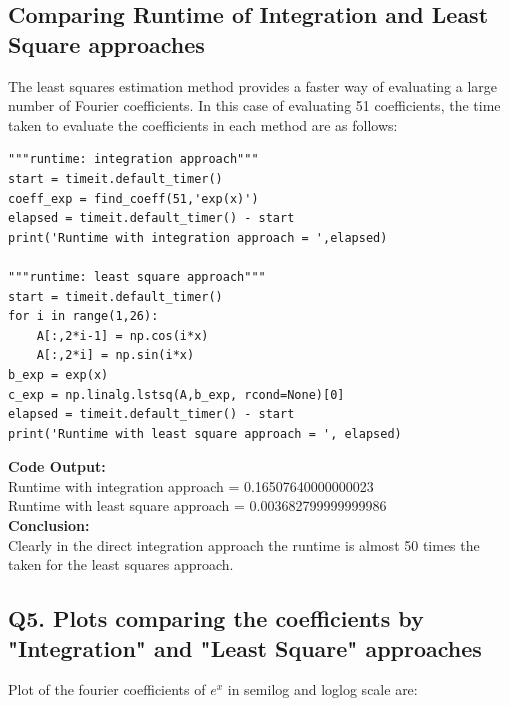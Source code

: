 \documentclass{article}
\begin{document}
\vspace{5mm}

\subsection*{Comparing Runtime of Integration and Least Square approaches}

The least squares estimation method provides a faster way of evaluating a
large number of Fourier coefficients. In this case of evaluating 51 coefficients,
the time taken to evaluate the coefficients in each method are as follows:
\vspace{2mm}
\begin{lstlisting}
"""runtime: integration approach"""
start = timeit.default_timer()
coeff_exp = find_coeff(51,'exp(x)')
elapsed = timeit.default_timer() - start
print('Runtime with integration approach = ',elapsed)

"""runtime: least square approach"""
start = timeit.default_timer()
for i in range(1,26):
	A[:,2*i-1] = np.cos(i*x)
	A[:,2*i] = np.sin(i*x) 
b_exp = exp(x)  
c_exp = np.linalg.lstsq(A,b_exp, rcond=None)[0]
elapsed = timeit.default_timer() - start
print('Runtime with least square approach = ', elapsed)
\end{lstlisting}
\textbf{Code Output:}\\[2mm]Runtime with integration approach = 0.16507640000000023\\
Runtime with least square approach = 0.003682799999999986\\[4mm]
\textbf{Conclusion:}\\[1mm]
Clearly in the direct integration approach the runtime is almost
50 times the taken for the least squares approach.

\newpage
\subsection*{ Q5. Plots comparing the coefficients by "Integration" and "Least Square" approaches}

Plot of the fourier coefficients of $e^x$
in semilog and loglog scale are:
\end{document}
